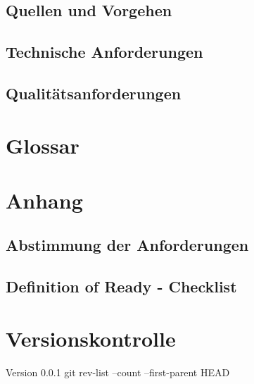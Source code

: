 \documentclass[a4paper,10pt]{report}
\begin{document}
\subsection{Quellen und Vorgehen}
\subsection{Technische Anforderungen}
\subsection{Qualitätsanforderungen}
\section{Glossar}
\listoffigures
\listoftables

\section{Anhang}

\subsection{Abstimmung der Anforderungen}
\subsection{Definition of Ready - Checklist}
\section{Versionskontrolle}
Version 0.0.1
git rev-list --count --first-parent HEAD
\end{document}
